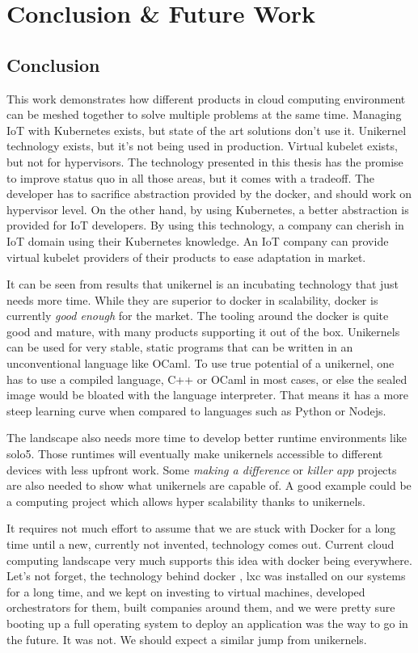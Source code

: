 \chapter{Conclusion \& Future Work}\label{chapter:conclusion}
\section{Conclusion}
This work demonstrates how different products in cloud computing environment can be meshed together to solve multiple problems at the same time. Managing IoT with Kubernetes exists, but state of the art solutions don't use it. Unikernel technology exists, but it's not being used in production. Virtual kubelet exists, but not for hypervisors. The technology presented in this thesis has the promise to improve status quo in all those areas, but it comes with a tradeoff. The developer has to sacrifice abstraction provided by the docker, and should work on hypervisor level. On the other hand, by using Kubernetes, a better abstraction is provided for IoT developers. By using this technology, a company can cherish in IoT domain using their Kubernetes knowledge. An IoT company can provide virtual kubelet providers of their products to ease adaptation in market.

It can be seen from results that unikernel is an incubating technology that just needs more time. While they are superior to docker in scalability, docker is currently \textit{good enough} for the market. The tooling around the docker is quite good and mature, with many products supporting it out of the box. Unikernels can be used for very stable, static programs that can be written in an unconventional language like OCaml. To use true potential of a unikernel, one has to use a compiled language, C++ or OCaml in most cases, or else the sealed image would be bloated with the language interpreter. That means it has a more steep learning curve when compared to languages such as Python or Nodejs.

The landscape also needs more time to develop better runtime environments like solo5. Those runtimes will eventually make unikernels accessible to different devices with less upfront work. Some \textit{making a difference} or \textit{killer app} projects are also needed to show what unikernels are capable of. A good example could be a computing project which allows hyper scalability thanks to unikernels.

It requires not much effort to assume that we are stuck with Docker for a long time until a new, currently not invented, technology comes out. Current cloud computing landscape very much supports this idea with docker being everywhere. Let's not forget, the technology behind docker , lxc was installed on our systems for a long time, and we kept on investing to virtual machines, developed orchestrators for them, built companies around them, and we were pretty sure booting up a full operating system to deploy an application was the way to go in the future. It was not. We should expect a similar jump from unikernels.

